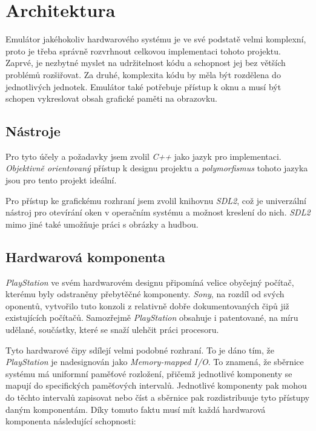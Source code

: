 \chapter{Architektura}

Emulátor jakéhokoliv hardwarového systému je ve své podstatě velmi komplexní, 
proto je třeba správně rozvrhnout celkovou implementaci tohoto projektu. 
Zaprvé, je nezbytné myslet na udržitelnost kódu a schopnost jej bez větších problémů rozšiřovat. 
Za druhé, komplexita kódu by měla být rozdělena do jednotlivých jednotek.
Emulátor také potřebuje přístup k oknu a musí být schopen vykreslovat obsah grafické paměti na obrazovku.

\section{Nástroje}

Pro tyto účely a požadavky jsem zvolil \textit{C++} jako jazyk pro implementaci. 
\textit{Objektivně orientovaný} přístup k designu projektu a \textit{polymorfismus} tohoto jazyka jsou pro tento projekt ideální.

Pro přístup ke grafickému rozhraní jsem zvolil knihovnu \textit{SDL2}, což je univerzální 
nástroj pro otevírání oken v operačním systému a možnost kreslení do nich. \textit{SDL2} mimo jiné také umožňuje práci s obrázky a hudbou.

\section{Hardwarová komponenta}

\textit{PlayStation} ve svém hardwarovém designu připomíná velice obyčejný počítač, kterému byly odstraněny přebytěčné komponenty.
\textit{Sony}, na rozdíl od svých oponentů, vytvořilo tuto konzoli z relativně dobře dokumentovaných čipů již existujících počítačů. 
Samozřejmě \textit{PlayStation} obsahuje i patentované, na míru udělané, součástky, které se snaží ulehčit práci procesoru.

Tyto hardwarové čipy sdílejí velmi podobné rozhraní. 
To je dáno tím, že \textit{PlayStation} je nadesignován jako \textit{Memory-mapped I/O}.
To znamená, že sběrnice systému má uniformní paměťové rozložení, přičemž jednotlivé komponenty se mapují do specifických paměťových intervalů. 
Jednotlivé komponenty pak mohou do těchto intervalů zapisovat nebo číst a sběrnice pak rozdistribuuje tyto přístupy daným komponentám.
Díky tomuto faktu musí mít každá hardwarová komponenta následující schopnosti:

